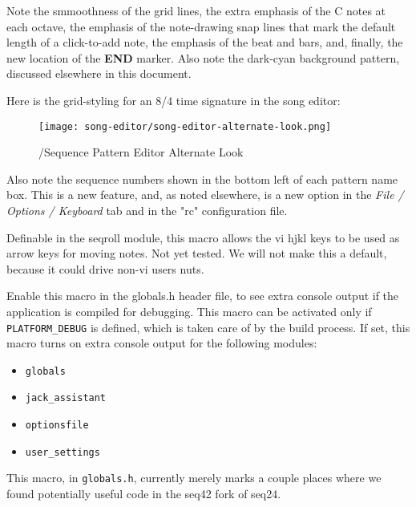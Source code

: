         Note the smmoothness of the grid lines, the extra emphasis of the C
        notes at each octave, the emphasis of the note-drawing snap lines that
        mark the default length of a click-to-add note, the emphasis of the
        beat and bars, and, finally, the new location of the
        \textbf{END} marker.  Also note the dark-cyan background pattern,
        discussed elsewhere in this document.

        Here is the grid-styling for an 8/4 time signature in the song editor:

\begin{figure}[H]
   \centering 
   \texttt{[image: song-editor/song-editor-alternate-look.png]}
   \caption{/Sequence Pattern Editor Alternate Look}
   \label{fig:seq64_song_editor_alternate_look}
\end{figure}

      Also note the sequence numbers shown in the bottom left of each pattern
      name box. This is a new feature, and, as noted elsewhere, is a new
      option in the \textsl{File / Options / Keyboard} tab and in
      the "rc" configuration file.

        Definable in the seqroll module, this macro allows the vi hjkl keys to
        be used as arrow keys for moving notes.  Not yet tested.  We will not
        make this a default, because it could drive non-vi users nuts.

        Enable this macro in the globals.h header file, to see extra console
        output if the application is compiled for debugging.  This macro can be
        activated only if \texttt{PLATFORM\_DEBUG} is defined, which is taken
        care of by the build process.  If set, this macro turns on extra
        console output for the following modules:

        \begin{itemize}
           \item \texttt{globals}
           \item \texttt{jack\_assistant}
           \item \texttt{optionsfile}
           \item \texttt{user\_settings}
        \end{itemize}

        This macro, in \texttt{globals.h}, currently merely marks a couple
        places where we found potentially useful code in the seq42 fork of
        seq24.

